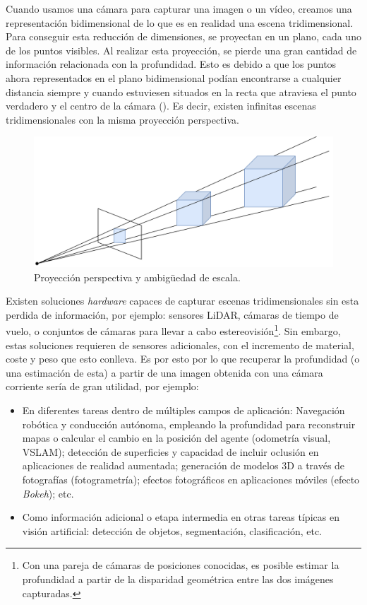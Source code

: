 
Cuando usamos una cámara para capturar una imagen o un vídeo, creamos una representación bidimensional de lo que es en realidad una escena tridimensional. Para conseguir esta reducción de dimensiones, se proyectan en un plano, cada uno de los puntos visibles. Al realizar esta proyección, se pierde una gran cantidad de información relacionada con la profundidad. Esto es debido a que los puntos ahora representados en el plano bidimensional podían encontrarse a cualquier distancia siempre y cuando estuviesen situados en la recta que atraviesa el punto verdadero y el centro de la cámara (). Es decir, existen infinitas escenas tridimensionales con la misma proyección perspectiva.

\begin{figure}[H]
\centering
\includegraphics[width=0.65\linewidth]{imagenes/proyeccion-perspectiva.png} 
\captionsetup{width=.8\linewidth}
\caption{Proyección perspectiva y ambigüedad de escala.}
\label{fig:proyeccion-perspectiva}
\end{figure}

Existen soluciones \textit{hardware} capaces de capturar escenas tridimensionales sin esta perdida de información, por ejemplo: sensores LiDAR, cámaras de tiempo de vuelo, o conjuntos de cámaras para llevar a cabo estereovisión\footnote{Con una pareja de cámaras de posiciones conocidas, es posible estimar la profundidad a partir de la disparidad geométrica entre las dos imágenes capturadas.}\cite{hartley_zisserman_2004}. Sin embargo, estas soluciones requieren de sensores adicionales, con el incremento de material, coste y peso que esto conlleva. Es por esto por lo que recuperar la profundidad (o una estimación de esta) a partir de una imagen obtenida con una cámara corriente sería de gran utilidad, por ejemplo:

\begin{itemize}
    \item En diferentes tareas dentro de múltiples campos de aplicación: Navegación robótica y conducción autónoma, empleando la profundidad para reconstruir mapas o calcular el cambio en la posición del agente (odometría visual, VSLAM); detección de superficies y capacidad de incluir oclusión en aplicaciones de realidad aumentada; generación de modelos 3D a través de fotografías (fotogrametría); efectos fotográficos en aplicaciones móviles (efecto \textit{Bokeh}); etc.
    \item Como información adicional o etapa intermedia en otras tareas típicas en visión artificial: detección de objetos, segmentación, clasificación, etc.
\end{itemize}

